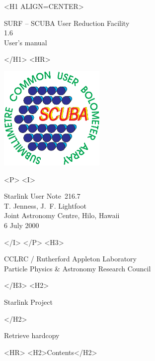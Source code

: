 \documentclass[twoside,11pt]{article}
\newcommand{\stardoccategory}  {Starlink User Note}
\newcommand{\stardocsource}    {sun\stardocnumber}
\newcommand{\stardocnumber}    {216.7}
\newcommand{\stardocauthors}   {T. Jenness, J.~F. Lightfoot\\
                                Joint Astronomy Centre, Hilo, Hawaii}
\newcommand{\stardocdate}      {6 July 2000}
\newcommand{\stardoctitle}     {SURF -- SCUBA User Reduction Facility}
\newcommand{\stardocversion}   {1.6}
\newcommand{\stardocmanual}    {User's manual}
\newcommand{\htmladdnormallink}[2]{#1}
\newcommand{\htmladdimg}[1]{}
\newcommand{\htmlref}[2]{#1}
\newcommand{\htmladdtonavigation}[1]{}
\newcommand{\xlabel}[1]{}
\renewcommand{\_}{\texttt{\symbol{95}}}
\begin{document}
\begin{htmlonly}
   \xlabel{}
   \begin{rawhtml} <H1 ALIGN=CENTER> \end{rawhtml}
      \stardoctitle\\
      \stardocversion\\
      \stardocmanual
   \begin{rawhtml} </H1> <HR> \end{rawhtml}

\includegraphics[width=2.0in]{sun216_logo.eps}

   \begin{rawhtml} <P> <I> \end{rawhtml}
   \stardoccategory\ \stardocnumber \\
   \stardocauthors \\
   \stardocdate
   \begin{rawhtml} </I> </P> <H3> \end{rawhtml}
      \htmladdnormallink{CCLRC}{http://www.cclrc.ac.uk} /
      \htmladdnormallink{Rutherford Appleton Laboratory}
                        {http://www.cclrc.ac.uk/ral} \\
      \htmladdnormallink{Particle Physics \& Astronomy Research Council}
                        {http://www.pparc.ac.uk} \\
   \begin{rawhtml} </H3> <H2> \end{rawhtml}
      \htmladdnormallink{Starlink Project}{http://star-www.rl.ac.uk/}
   \begin{rawhtml} </H2> \end{rawhtml}
   \htmladdnormallink{\htmladdimg{source.gif} Retrieve hardcopy}
      {http://star-www.rl.ac.uk/cgi-bin/hcserver?\stardocsource}\\

  \label{stardoccontents}
  \begin{rawhtml} 
    <HR>
    <H2>Contents</H2>
  \end{rawhtml}
  \htmladdtonavigation{\htmlref{\htmladdimg{contents_motif.gif}}
        {stardoccontents}}


\end{htmlonly}
\end{document}
